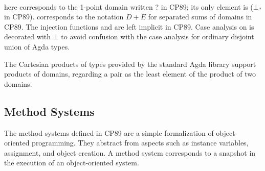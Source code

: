 \begin{AgdaAlign}
\begin{code}
\AgdaSpace{}%
\AgdaSpace{}%
\AgdaSpace{}%
\AgdaSpace{}%
\AgdaSpace{}%
\AgdaSpace{}%
\AgdaSpace{}%
\AgdaSymbol{)}\AgdaSpace{}%
\<%
\\
%
\>[19]\AgdaSpace{}%
\AgdaSpace{}%
\AgdaSpace{}%
\AgdaSpace{}%
\AgdaSpace{}%
\AgdaSpace{}%
\AgdaSpace{}%
\AgdaSpace{}%
\AgdaSpace{}%
\AgdaSymbol{)}\<%
\end{code}
%
 here corresponds to the 1-point domain written $?$ in CP89;
its only element is  ($⊥_?$ in CP89).
 corresponds to the notation $D + E$ for separated sums of domains in CP89.
The injection functions  and  are left implicit in CP89.
Case analysis  on  is decorated with $⊥$ to avoid confusion with
the case analysis for ordinary disjoint union of Agda types.

The Cartesian products of types provided by the standard Agda library support products of domains,
regarding a pair  as the least element of the product of two domains.  

\subsection{Method Systems}

The method systems defined in CP89 are a simple formalization of object-oriented programming.
They abstract from aspects such as instance variables, assignment, and object creation.
A method system corresponds to a snapshot in the execution of an object-oriented system.


\end{AgdaAlign}
